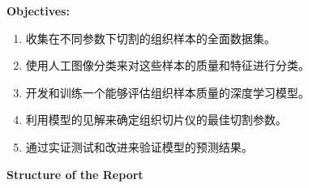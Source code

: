 \textbf{Objectives:}

\begin{enumerate}
\item 收集在不同参数下切割的组织样本的全面数据集。
\item 使用人工图像分类来对这些样本的质量和特征进行分类。
\item 开发和训练一个能够评估组织样本质量的深度学习模型。
\item 利用模型的见解来确定组织切片仪的最佳切割参数。
\item 通过实证测试和改进来验证模型的预测结果。
\end{enumerate}

\textbf{Structure of the Report}





